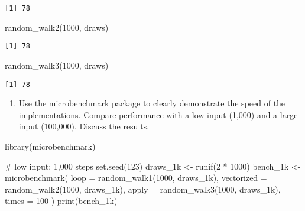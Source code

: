 \documentclass[
  letterpaper,
  DIV=11,
  numbers=noendperiod]{scrartcl}
\newenvironment{Shaded}{\begin{snugshade}}{\end{snugshade}}
\newcommand{\AttributeTok}[1]{\textcolor[rgb]{0.40,0.45,0.13}{#1}}
\newcommand{\CommentTok}[1]{\textcolor[rgb]{0.37,0.37,0.37}{#1}}
\newcommand{\DecValTok}[1]{\textcolor[rgb]{0.68,0.00,0.00}{#1}}
\newcommand{\FunctionTok}[1]{\textcolor[rgb]{0.28,0.35,0.67}{#1}}
\newcommand{\NormalTok}[1]{\textcolor[rgb]{0.00,0.23,0.31}{#1}}
\newcommand{\OtherTok}[1]{\textcolor[rgb]{0.00,0.23,0.31}{#1}}
\newcommand{\SpecialCharTok}[1]{\textcolor[rgb]{0.37,0.37,0.37}{#1}}
\providecommand{\tightlist}{%
  \setlength{\itemsep}{0pt}\setlength{\parskip}{0pt}}
\begin{document}
\begin{verbatim}
[1] 78
\end{verbatim}

\begin{Shaded}
\begin{Highlighting}[]
\FunctionTok{random\_walk2}\NormalTok{(}\DecValTok{1000}\NormalTok{, draws)}
\end{Highlighting}
\end{Shaded}

\begin{verbatim}
[1] 78
\end{verbatim}

\begin{Shaded}
\begin{Highlighting}[]
\FunctionTok{random\_walk3}\NormalTok{(}\DecValTok{1000}\NormalTok{, draws)}
\end{Highlighting}
\end{Shaded}

\begin{verbatim}
[1] 78
\end{verbatim}

\begin{enumerate}
\def\labelenumi{\arabic{enumi}.}
\setcounter{enumi}{2}
\tightlist
\item
  Use the microbenchmark package to clearly demonstrate the speed of the
  implementations. Compare performance with a low input (1,000) and a
  large input (100,000). Discuss the results.\\
\end{enumerate}

\begin{Shaded}
\begin{Highlighting}[]
\FunctionTok{library}\NormalTok{(microbenchmark)}

\CommentTok{\# low input: 1,000 steps}
\FunctionTok{set.seed}\NormalTok{(}\DecValTok{123}\NormalTok{)}
\NormalTok{draws\_1k }\OtherTok{\textless{}{-}} \FunctionTok{runif}\NormalTok{(}\DecValTok{2} \SpecialCharTok{*} \DecValTok{1000}\NormalTok{)}
\NormalTok{bench\_1k }\OtherTok{\textless{}{-}} \FunctionTok{microbenchmark}\NormalTok{(}
  \AttributeTok{loop =} \FunctionTok{random\_walk1}\NormalTok{(}\DecValTok{1000}\NormalTok{, draws\_1k),}
  \AttributeTok{vectorized =} \FunctionTok{random\_walk2}\NormalTok{(}\DecValTok{1000}\NormalTok{, draws\_1k),}
  \AttributeTok{apply =} \FunctionTok{random\_walk3}\NormalTok{(}\DecValTok{1000}\NormalTok{, draws\_1k),}
  \AttributeTok{times =} \DecValTok{100}
\NormalTok{)}
\FunctionTok{print}\NormalTok{(bench\_1k)}
\end{Highlighting}
\end{Shaded}
\end{document}

